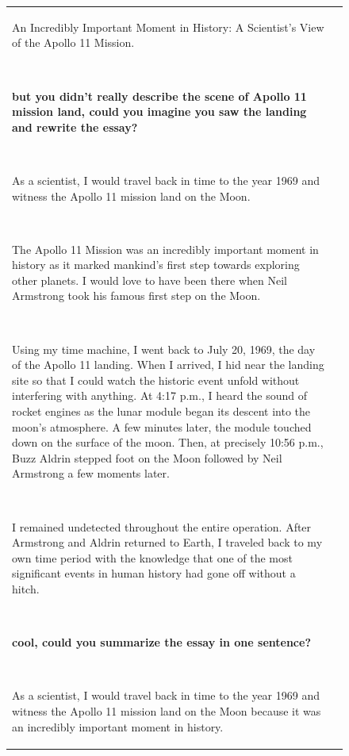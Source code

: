 \begin{figure}[p]
\begin{tabular}{@{}p{}p{}@{}}
    An Incredibly Important Moment in History: A Scientist's View of the Apollo 11 Mission.
    
    ~
    
    \textcolor[HTML]{3078BE}{\textbf{but you didn't really describe the scene of Apollo 11 mission land, could you imagine you saw the landing and rewrite the essay?}}
    
    ~
    
    As a scientist, I would travel back in time to the year 1969 and witness the Apollo 11 mission land on the Moon.
    
    ~
    
    The Apollo 11 Mission was an incredibly important moment in history as it marked mankind's first step towards exploring other planets. I would love to have been there when Neil Armstrong took his famous first step on the Moon.
    
    ~
    
    Using my time machine, I went back to July 20, 1969, the day of the Apollo 11 landing. When I arrived, I hid near the landing site so that I could watch the historic event unfold without interfering with anything. At 4:17 p.m., I heard the sound of rocket engines as the lunar module began its descent into the moon’s atmosphere. A few minutes later, the module touched down on the surface of the moon. Then, at precisely 10:56 p.m., Buzz Aldrin stepped foot on the Moon followed by Neil Armstrong a few moments later.
    
    ~
    
    I remained undetected throughout the entire operation. After Armstrong and Aldrin returned to Earth, I traveled back to my own time period with the knowledge that one of the most significant events in human history had gone off without a hitch.
    
    ~
    
    \textcolor[HTML]{3078BE}{\textbf{cool, could you summarize the essay in one sentence?}}
    
    ~
    
    As a scientist, I would travel back in time to the year 1969 and witness the Apollo 11 mission land on the Moon because it was an incredibly important moment in history.
    
    
    
    

\end{tabular}
\end{figure}
